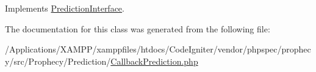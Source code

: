 Implements \mbox{\hyperlink{interface_prophecy_1_1_prediction_1_1_prediction_interface_a8753cea9fc952add136830abab587633}{Prediction\+Interface}}.



The documentation for this class was generated from the following file\+:\begin{DoxyCompactItemize}
\item 
/\+Applications/\+X\+A\+M\+P\+P/xamppfiles/htdocs/\+Code\+Igniter/vendor/phpspec/prophecy/src/\+Prophecy/\+Prediction/\mbox{\hyperlink{_callback_prediction_8php}{Callback\+Prediction.\+php}}\end{DoxyCompactItemize}
